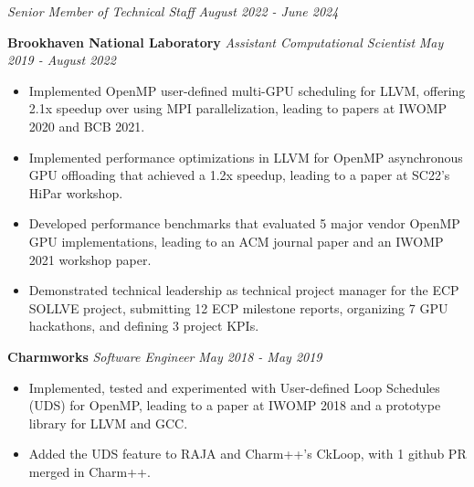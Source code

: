 \noindent
\textit{Senior Member of Technical Staff} \hfill \textit{August 2022 - June 2024}
\begin{itemize}[itemsep=-0.1em]
\myExpTwo 
\end{itemize}

\newcommand{\myExpThree}{
   \item Implemented OpenMP user-defined multi-GPU scheduling for LLVM, offering 2.1x speedup over using MPI parallelization, leading to papers at IWOMP 2020 and BCB 2021.
   \item Implemented performance optimizations in LLVM for OpenMP asynchronous GPU offloading that achieved a 1.2x speedup, leading to a paper at SC22's HiPar workshop. 
   \item Developed performance benchmarks that evaluated 5 major vendor OpenMP GPU implementations, leading to an ACM journal paper and an IWOMP 2021 workshop paper. 
   \item Demonstrated technical leadership as technical project manager for the ECP SOLLVE project, submitting 12 ECP milestone reports, organizing 7 GPU hackathons, and defining 3 project KPIs.
   }
\noindent
\textbf{Brookhaven National Laboratory}\hfill
\textit{Assistant Computational Scientist} \hfill \textit{May 2019 - August 2022}
\begin{itemize}[itemsep=-0.1em]
\myExpThree
\end{itemize}


\newcommand{\myExpFour}{
\item Implemented, tested and experimented with User-defined Loop Schedules (UDS) for OpenMP, leading to a paper at IWOMP 2018 and a prototype library for LLVM and GCC.
\item Added the UDS feature to RAJA and Charm++'s CkLoop, with 1 github PR merged in Charm++.
}
\noindent
\textbf{Charmworks}\hfill
\textit{Software Engineer} \hfill \textit{May 2018 - May 2019}
\vspace{-0.01in}
\begin{itemize}[itemsep=-0.1em]
\myExpFour
\end{itemize}

